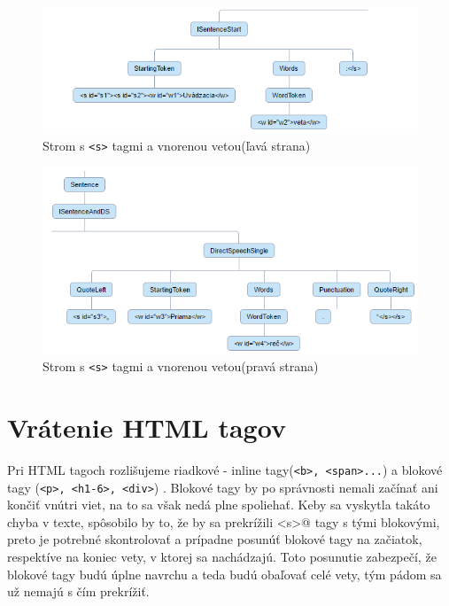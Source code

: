 \documentclass[12pt,a4paper]{report}
\theoremstyle{definition}
\theoremstyle{remark}
\begin{document}
\begin{figure}[H]
\centering
\includegraphics[scale=2.8]{sentenceTagsAndNestedSentenceLeft}
\caption{Strom s \texttt{<s>}  tagmi a vnorenou vetou(ľavá strana)}
\end{figure}
\begin{figure}[H]
\centering
\includegraphics[scale=2.6]{sentenceTagsAndNestedSentenceRight}
\setlength{\belowcaptionskip}{-10pt}

\caption{Strom s \texttt{<s>}  tagmi a vnorenou vetou(pravá strana)}
\end{figure}

\section{Vrátenie HTML tagov}
Pri HTML tagoch rozlišujeme riadkové - inline tagy(\verb!<b>, <span>...!) a blokové tagy (\verb!<p>, <h1-6>, <div>!) . Blokové tagy by po správnosti nemali začínať ani končiť vnútri viet, na to sa však nedá plne spoliehať. Keby sa vyskytla takáto chyba v texte, spôsobilo by to, že by sa prekrížili \verb@<s>@ tagy s tými blokovými, preto je potrebné skontrolovať a prípadne posunúť blokové tagy na začiatok, respektíve na koniec vety, v ktorej sa nachádzajú. Toto posunutie zabezpečí, že blokové tagy budú úplne navrchu a teda budú obaľovať celé vety, tým pádom sa už nemajú s čím prekrížiť.
\end{document}
